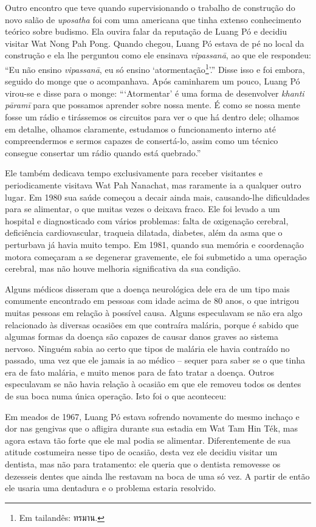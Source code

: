 Outro encontro que teve quando supervisionando o trabalho de construção
do novo salão de \emph{uposatha} foi com uma americana que tinha extenso
conhecimento teórico sobre budismo. Ela ouvira falar da reputação de
Luang Pó e decidiu visitar Wat Nong Pah Pong. Quando chegou, Luang Pó
estava de pé no local da construção e ela lhe perguntou como ele
ensinava \emph{vipassanā}, ao que ele respondeu: ``Eu não ensino
\emph{vipassanā}, eu só ensino `atormentação\footnote{Em tailandês:
  ทรมาน.}'.'' Disse isso e foi embora, seguido do monge que o
acompanhava. Após caminharem um pouco, Luang Pó virou-se e disse para o
monge: ```Atormentar' é uma forma de desenvolver \emph{khanti pāramī}
para que possamos aprender sobre nossa mente. É como se nossa mente
fosse um rádio e tirássemos os circuitos para ver o que há dentro dele;
olhamos em detalhe, olhamos claramente, estudamos o funcionamento
interno até compreendermos e sermos capazes de consertá-lo, assim como
um técnico consegue consertar um rádio quando está quebrado.''

Ele também dedicava tempo exclusivamente para receber visitantes e
periodicamente visitava Wat Pah Nanachat, mas raramente ia a qualquer
outro lugar. Em 1980 sua saúde começou a decair ainda mais, causando-lhe
dificuldades para se alimentar, o que muitas vezes o deixava fraco. Ele
foi levado a um hospital e diagnosticado com vários problemas: falta de
oxigenação cerebral, deficiência cardiovascular, traqueia dilatada,
diabetes, além da asma que o perturbava já havia muito tempo. Em 1981,
quando sua memória e coordenação motora começaram a se degenerar
gravemente, ele foi submetido a uma operação cerebral, mas não houve
melhoria significativa da sua condição.

Alguns médicos disseram que a doença neurológica dele era de um tipo
mais comumente encontrado em pessoas com idade acima de 80 anos, o que
intrigou muitas pessoas em relação à possível causa. Alguns especulavam
se não era algo relacionado às diversas ocasiões em que contraíra
malária, porque é sabido que algumas formas da doença são capazes de
causar danos graves ao sistema nervoso. Ninguém sabia ao certo que tipos
de malária ele havia contraído no passado, uma vez que ele jamais ia ao
médico -- sequer para saber se o que tinha era de fato malária, e muito
menos para de fato tratar a doença. Outros especulavam se não havia
relação à ocasião em que ele removeu todos os dentes de sua boca numa
única operação. Isto foi o que aconteceu:

Em meados de 1967, Luang Pó estava sofrendo novamente do mesmo inchaço e
dor nas gengivas que o afligira durante sua estadia em Wat Tam Hin Ték,
mas agora estava tão forte que ele mal podia se alimentar.
Diferentemente de sua atitude costumeira nesse tipo de ocasião, desta
vez ele decidiu visitar um dentista, mas não para tratamento: ele queria
que o dentista removesse os dezesseis dentes que ainda lhe restavam na
boca de uma só vez. A partir de então ele usaria uma dentadura e o
problema estaria resolvido.

